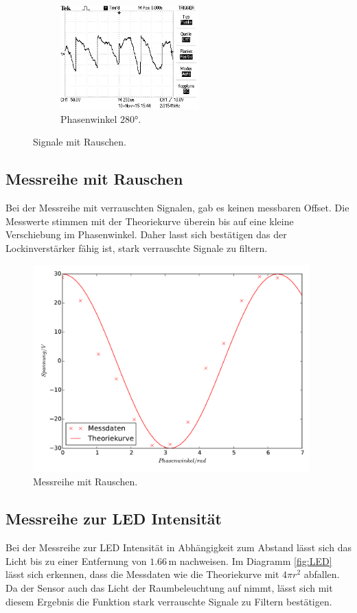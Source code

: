 \begin{figure}
\begin{subfigure}{0.48\textwidth}
\label{fig:rp190}
\end{subfigure}
\begin{subfigure}{0.48\textwidth}
\centering
\includegraphics[height=4cm]{Bilder/r/r280.JPG}
\caption{Phasenwinkel $280°$.}
\label{fig:rp280}
\end{subfigure}
\caption{Signale mit Rauschen.}
\label{fig:Signale mit Rauschen}
\end{figure}

\subsection{Messreihe mit Rauschen}
\label{sec:Messreihe mit Rauschen}
Bei der Messreihe mit verrauschten Signalen, gab es keinen messbaren Offset. Die
Messwerte stimmen mit der Theoriekurve überein bis auf eine kleine Verschiebung
im Phasenwinkel. Daher lasst sich bestätigen das der Lockinverstärker fähig ist,
stark verrauschte Signale zu filtern.
\begin{figure}
  \centering
  \includegraphics[height=8cm]{r_signal.pdf}
  \caption{Messreihe mit Rauschen.}
  \label{fig:Mr}
\end{figure}

\subsection{Messreihe zur LED Intensität}
\label{sec:Messreihe zur LED intensität}
Bei der Messreihe zur LED Intensität in Abhängigkeit zum Abstand lässt sich das
Licht bis zu einer Entfernung von $1.66\,\si{\meter}$ nachweisen. Im Diagramm
\ref{fig:LED} lässt sich erkennen, dass die Messdaten wie die Theoriekurve mit
$ 4\pi r^2$ abfallen. Da der Sensor auch das Licht der Raumbeleuchtung auf nimmt,
 lässt sich mit diesem Ergebnis die Funktion stark verrauschte Signale zu
Filtern bestätigen.

